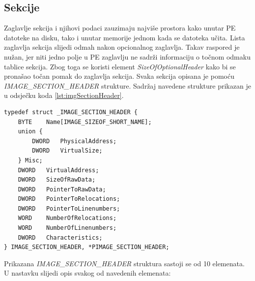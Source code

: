 \documentclass[times, utf8, diplomski, numeric]{fer}
\begin{document}
\subsection{Sekcije}
\label{sec:sekcije}

Zaglavlje sekcija i njihovi podaci zauzimaju najviše prostora
kako unutar PE datoteke na disku, tako i unutar memorije jednom
kada se datoteka učita. Lista zaglavlja sekcija slijedi odmah
nakon opcionalnog zaglavlja. Takav raspored je nužan, jer niti
jedno polje u PE zaglavlju ne sadrži informaciju o točnom odmaku
tablice sekcija. Zbog toga se koristi element
\emph{SizeOfOptionalHeader} kako bi se pronašao točan pomak do
zaglavlja sekcija. Svaka sekcija opisana je pomoću
\emph{IMAGE\_SECTION\_HEADER} strukture. Sadržaj navedene
strukture prikazan je u odsječku koda \ref{lst:imgSectionHeader}.

\begin{lstlisting}[frame=single, caption=IMAGE\_SECTION\_HEADER struktura, label={lst:imgSectionHeader}]
typedef struct _IMAGE_SECTION_HEADER {
	BYTE    Name[IMAGE_SIZEOF_SHORT_NAME];
	union {
		DWORD   PhysicalAddress;
		DWORD   VirtualSize;
	} Misc;
	DWORD   VirtualAddress;
	DWORD   SizeOfRawData;
	DWORD   PointerToRawData;
	DWORD   PointerToRelocations;
	DWORD   PointerToLinenumbers;
	WORD    NumberOfRelocations;
	WORD    NumberOfLinenumbers;
	DWORD   Characteristics;
} IMAGE_SECTION_HEADER, *PIMAGE_SECTION_HEADER;
\end{lstlisting}

Prikazana \emph{IMAGE\_SECTION\_HEADER} struktura sastoji se od
10 elemenata. U nastavku slijedi opis svakog od navedenih				%
elemenata:
\end{document}
